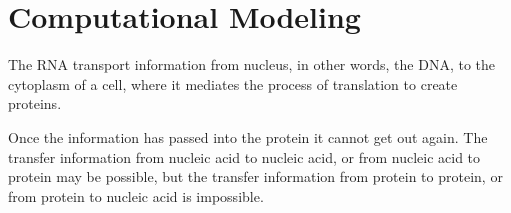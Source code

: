 \chapter{Computational Modeling}
The RNA transport information from nucleus, in other words, the DNA, to the
cytoplasm of a cell, where it mediates the process of translation to create proteins.

Once the information has passed into the protein it cannot get out again. The 
transfer information from nucleic acid to nucleic acid, or from nucleic acid to 
protein may be possible, but the transfer information from protein to protein,
or from protein to nucleic acid is impossible. 